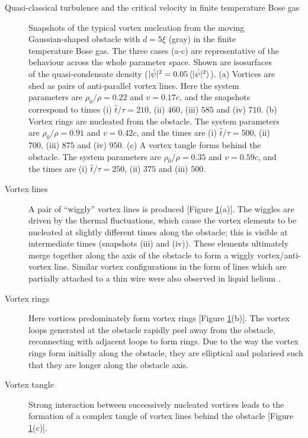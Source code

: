 \begin{chapter}{\label{cha:nonequib}Quasi-classical turbulence and the critical velocity in finite temperature Bose gas}
\begin{figure}
    \caption{\label{fig:vort-lines} Snapshots of the typical vortex nucleation from the moving Gaussian-shaped obstacle with $d=5\xi$ (gray) in the finite temperature Bose gas. The three cases (a-c) are representative of the behaviour across the whole parameter space. Shown are  isosurfaces of the quasi-condensate density ($|\hat{\psi}|^2 = 0.05\braket{|\hat{\psi}|^2}$).  (a) Vortices are shed as pairs of anti-parallel vortex lines.  Here the system parameters are $\rho_0/\rho = 0.22$ and $v=0.17c$, and the snapshots correspond to times (i) $\hat{t}/\tau=210$, (ii) $460$, (iii) $585$ and (iv) $710$.  (b) Vortex rings are nucleated from the obstacle.  The system parameters are $\rho_0/\rho = 0.91$ and $v=0.42c$, and the times are (i) $\hat{t}/\tau=500$, (ii) $700$, (iii) $875$ and (iv) $950$. (c) A vortex tangle forms behind the obstacle. The system parameters are $\rho_0/\rho = 0.35$ and $v=0.59c$, and the times are (i) $\hat{t}/\tau=250$, (ii) $375$ and (iii) $500$. }
\end{figure}


\begin{description}
\item[Vortex lines] A pair of ``wiggly'' vortex lines is produced  [Figure  \ref{fig:vort-lines}(a)].  The wiggles are driven by the thermal fluctuations, which cause the vortex elements to be nucleated at slightly different times along the obstacle; this is visible at intermediate times (snapshots (iii) and (iv)).   These elements ultimately merge together along the axis of the obstacle to form a wiggly vortex/anti-vortex line. Similar vortex configurations
in the form of lines which are partially attached to a thin wire 
were also observed in liquid helium \cite{zieve2001}. 
\item[Vortex rings]  Here vortices predominately form vortex
rings [Figure \ref{fig:vort-lines}(b)].  The vortex loops generated
at the obstacle rapidly peel away from the obstacle, reconnecting with
adjacent loops to form rings. Due to the way the vortex rings form initially along the obstacle, they are elliptical and polarised such that they are longer along the obstacle axis. 
\item[Vortex tangle]  Strong
interaction between successively nucleated vortices leads to the formation of a complex tangle of vortex lines behind the obstacle [Figure \ref{fig:vort-lines}(c)].
\end{description}


\end{chapter}
